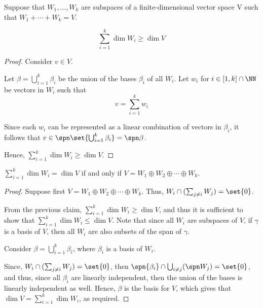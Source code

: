 \documentclass[11pt]{scrartcl}
\begin{document}
Suppose that $W_1, \dots, W_{k}$ are subspaces of a finite-dimensional
vector space V such that $W_1+\cdots+W_k = V$.

\begin{claim*}

  \begin{equation*}
    \sum_{i=1}^k\dim W_i \geq \dim V
  \end{equation*}

\end{claim*}

\begin{proof}

  Consider $v\in V$.

  Let $\beta = \bigcup_{i=1}^k\beta_i$ be the union of the bases
  $\beta_i$ of all $W_i$. Let $w_{i}$ for $i\in[1,k]\cap \NN$ be
  vectors in $W_i$ such that
  \begin{equation*}
    v = \sum_{i=1}^kw_{i}
  \end{equation*}


  Since each $w_i$ can be represented as a linear combination of
  vectors in $\beta_i$, it follows that
  $v\in \spn\set{\bigcup_{i=1}^k\beta_i} = \spn \beta$.

  Hence, $\sum_{i=1}^k\dim W_i \geq \dim V$.
\end{proof}
\begin{claim*}
  $\sum_{i=1}^k \dim W_i = \dim V $ if and only if
  $ V = W_1 \oplus W_2 \oplus \cdots \oplus W_k$.
\end{claim*}
\begin{proof}
  Suppose first $ V = W_1 \oplus W_2 \oplus \cdots \oplus W_k$.
  Thus, $W_i\cap(\sum_{j\neq i}W_{j}) = \set{0}$.

  From the previous claim, $\sum_{i=1}^k\dim W_i \geq \dim V$, and
  thus it is sufficient to show that
  $\sum_{i=1}^k\dim W_i \leq \dim V$. Note that since all $W_i$ are
  subspaces of $V$, if $\gamma$ is a basis of $V$, then all $W_i$ are
  also subsets of the span of $\gamma$.

  Consider $\beta = \bigcup_{i=1}^k\beta_i$, where $\beta_{i}$ is a
  basis of $W_i$.

  Since, $W_i\cap(\sum_{j\neq i}W_{j}) = \set{0}$, then
  $\spn{\beta_i}\cap\bigcup_{i\neq j}(\spn W_{j}) = \set{0}$, and
  thus, since all $\beta_{i}$ are linearly independent, then the union
  of the bases is linearly independent as well. Hence, $\beta$ is the
  basis for $V$, which gives that $\dim V = \sum_{i=1}^k \dim W_{i}$,
  as required.
\end{proof}
\end{document}
